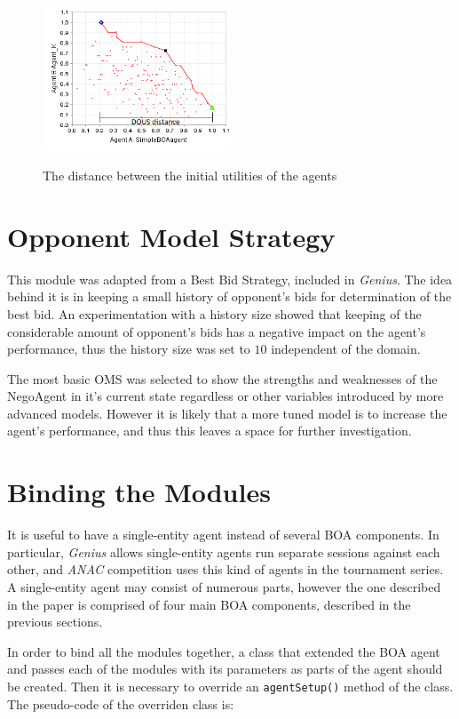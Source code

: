 \documentclass[html]{report}    %
\begin{document}
\begin{figure}[htbp]
  \caption{The distance between the initial utilities of the agents}
  \centering
    \includegraphics[width=0.5\textwidth]{dous}
    \label{3}
\end{figure}

\section{Opponent Model Strategy}  

This module was adapted from a Best Bid Strategy, included in \textit{Genius}. The idea behind it is in keeping a small history of opponent's bids for determination of the best bid. An experimentation with a history size showed that keeping of the considerable amount of opponent's bids has a negative impact on the agent's performance, thus the history size was set to $10$ independent of the domain.

The most basic OMS was selected to show the strengths and weaknesses of the NegoAgent in it's current state regardless or other variables introduced by more advanced models. However it is likely that a more tuned model is to increase the agent's performance, and thus this leaves a space for further investigation.

\section{Binding the Modules}

It is useful to have a single-entity agent instead of several BOA components. In particular, \textit{Genius} allows single-entity agents run separate sessions against each other, and \textit{ANAC} competition uses this kind of agents in the tournament series. A single-entity agent may consist of numerous parts, however the one described in the paper is comprised of four main BOA components, described in the previous sections.

In order to bind all the modules together, a class that extended the BOA agent and passes each of the modules with its parameters as parts of the agent should be created. Then it is necessary to override an \texttt{agentSetup()} method of the class. The pseudo-code of the overriden class is:
\end{document}
